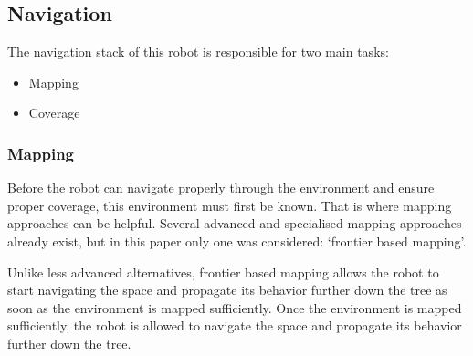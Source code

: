 \subsection{Navigation}

The navigation stack of this robot is responsible for two main tasks:

\begin{itemize}
\item Mapping
\item Coverage
\end{itemize}

\subsubsection{Mapping}

Before the robot can navigate properly through the environment and ensure proper coverage, this environment must first be known. That is where mapping approaches can be helpful. Several advanced and specialised mapping approaches already exist, but in this paper only one was considered: `frontier based mapping'. 

Unlike less advanced alternatives, frontier based mapping allows the robot to start navigating the space and propagate its behavior further down the tree as soon as the environment is mapped sufficiently. Once the environment is mapped sufficiently, the robot is allowed to navigate the space and propagate its behavior further down the tree.